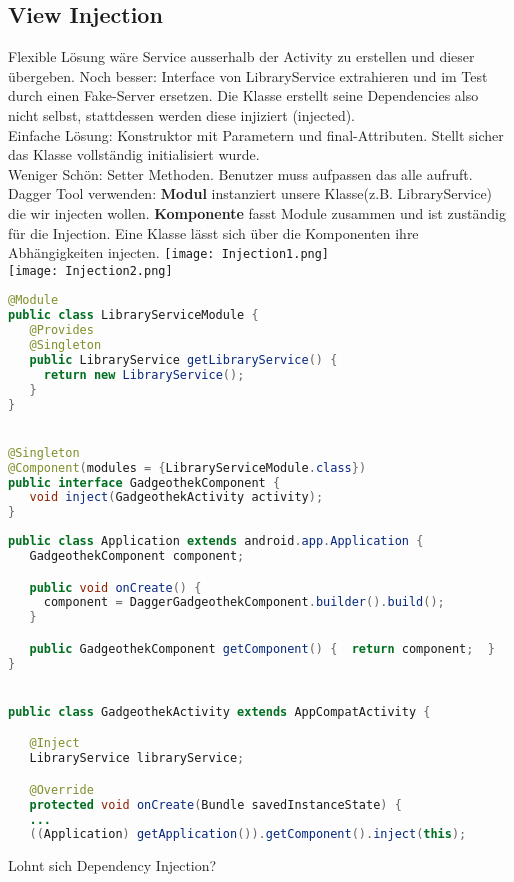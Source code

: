 \subsection{View Injection}
Flexible Lösung wäre Service ausserhalb der Activity zu erstellen und dieser übergeben. Noch besser: Interface von LibraryService extrahieren und im Test durch einen Fake-Server ersetzen. Die Klasse erstellt seine Dependencies also nicht selbst, stattdessen werden diese injiziert (injected). \\
Einfache Lösung: Konstruktor mit Parametern und final-Attributen. Stellt sicher das Klasse vollständig initialisiert wurde. \\
Weniger Schön: Setter Methoden. Benutzer muss aufpassen das alle aufruft. \\
Dagger Tool verwenden: \textbf{Modul} instanziert unsere Klasse(z.B. LibraryService) die wir injecten wollen. \textbf{Komponente} fasst Module zusammen und ist zuständig für die Injection. Eine Klasse lässt sich über die Komponenten ihre Abhängigkeiten injecten.
\texttt{[image: Injection1.png]} \\
\texttt{[image: Injection2.png]}
\begin{lstlisting}[language=java]
@Module
public class LibraryServiceModule {
   @Provides
   @Singleton
   public LibraryService getLibraryService() {
     return new LibraryService();
   }
}


@Singleton
@Component(modules = {LibraryServiceModule.class})
public interface GadgeothekComponent {
   void inject(GadgeothekActivity activity);
}
\end{lstlisting}
\begin{lstlisting}[language=java]
public class Application extends android.app.Application {
   GadgeothekComponent component;

   public void onCreate() {
     component = DaggerGadgeothekComponent.builder().build();
   }

   public GadgeothekComponent getComponent() {  return component;  }
}


public class GadgeothekActivity extends AppCompatActivity {

   @Inject
   LibraryService libraryService;

   @Override
   protected void onCreate(Bundle savedInstanceState) {
   ...
   ((Application) getApplication()).getComponent().inject(this);
\end{lstlisting}
Lohnt sich Dependency Injection? \\
